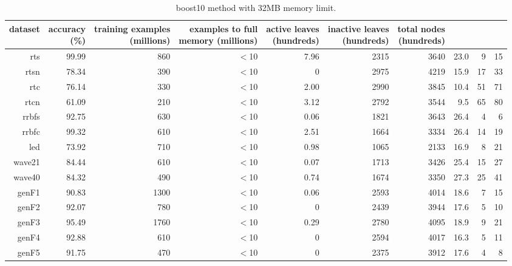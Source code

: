 \clearpage
\begin{table}
\caption{{\sc boost10} method with 32MB memory limit.}
\label{tab:boost10-32MB}
\centering
\begin{tabular}{|r|r|r|r|r|r|r|r|r|r|}
\hline
dataset	&
\rotatebox{90}{\parbox{9em}{accuracy\\(\%)}} &
\rotatebox{90}{\parbox{9em}{training examples\\(millions)}} &
\rotatebox{90}{\parbox{9em}{examples to full\\memory (millions)}} &
\rotatebox{90}{\parbox{9em}{active leaves\\(hundreds)}} &
\rotatebox{90}{\parbox{9em}{inactive leaves\\(hundreds)}} &
\rotatebox{90}{\parbox{9em}{total nodes\\(hundreds)}} &
\rotatebox{90}{\parbox{9em}{average tree depth}}	&
\rotatebox{90}{\parbox{9em}{training speed (\%)}} &
\rotatebox{90}{\parbox{9em}{prediction speed (\%)}} \\
\hline
{\sc rts} & 99.99 & 860 & $<$10 & 7.96 & 2315 & 3640 & 23.0 & 9 & 15 \\
{\sc rtsn} & 78.34 & 390 & $<$10 & 0 & 2975 & 4219 & 15.9 & 17 & 33 \\
{\sc rtc} & 76.14 & 330 & $<$10 & 2.00 & 2990 & 3845 & 10.4 & 51 & 71 \\
{\sc rtcn} & 61.09 & 210 & $<$10 & 3.12 & 2792 & 3544 & 9.5 & 65 & 80 \\
{\sc rrbfs} & 92.75 & 630 & $<$10 & 0.06 & 1821 & 3643 & 26.4 & 4 & 6 \\
{\sc rrbfc} & 99.32 & 610 & $<$10 & 2.51 & 1664 & 3334 & 26.4 & 14 & 19 \\
{\sc led} & 73.92 & 710 & $<$10 & 0.98 & 1065 & 2133 & 16.9 & 8 & 21 \\
{\sc wave21} & 84.44 & 610 & $<$10 & 0.07 & 1713 & 3426 & 25.4 & 15 & 27 \\
{\sc wave40} & 84.32 & 490 & $<$10 & 0.74 & 1674 & 3350 & 27.3 & 25 & 41 \\
{\sc genF1} & 90.83 & 1300 & $<$10 & 0.06 & 2593 & 4014 & 18.6 & 7 & 15 \\
{\sc genF2} & 92.07 & 780 & $<$10 & 0 & 2439 & 3944 & 17.6 & 5 & 10 \\
{\sc genF3} & 95.49 & 1760 & $<$10 & 0.29 & 2780 & 4095 & 18.9 & 9 & 21 \\
{\sc genF4} & 92.88 & 610 & $<$10 & 0 & 2594 & 4017 & 16.3 & 5 & 11 \\
{\sc genF5} & 91.75 & 470 & $<$10 & 0 & 2375 & 3912 & 17.6 & 4 & 8 \\

\end{tabular}
\end{table}
